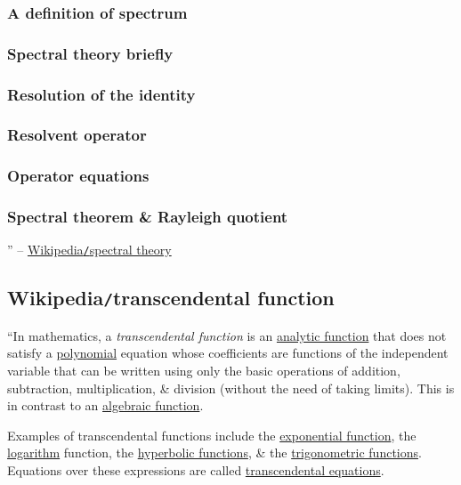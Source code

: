 \documentclass{article}
\begin{document}
\subsubsection{A definition of spectrum}

\subsubsection{Spectral theory briefly}

\subsubsection{Resolution of the identity}

\subsubsection{Resolvent operator}

\subsubsection{Operator equations}

\subsubsection{Spectral theorem \& Rayleigh quotient}

'' -- \href{https://en.wikipedia.org/wiki/Spectral_theory}{Wikipedia{\tt/}spectral theory}


\subsection{Wikipedia{\tt/}transcendental function}
``In mathematics, a {\it transcendental function} is an \href{https://en.wikipedia.org/wiki/Analytic_function}{analytic function} that does not satisfy a \href{https://en.wikipedia.org/wiki/Polynomial}{polynomial} equation whose coefficients are functions of the independent variable that can be written using only the basic operations of addition, subtraction, multiplication, \& division (without the need of taking limits). This is in contrast to an \href{https://en.wikipedia.org/wiki/Algebraic_function}{algebraic function}.

Examples of transcendental functions include the \href{https://en.wikipedia.org/wiki/Exponential_function}{exponential function}, the \href{https://en.wikipedia.org/wiki/Logarithm}{logarithm} function, the \href{https://en.wikipedia.org/wiki/Hyperbolic_function}{hyperbolic functions}, \& the \href{https://en.wikipedia.org/wiki/Trigonometric_function}{trigonometric functions}. Equations over these expressions are called \href{https://en.wikipedia.org/wiki/Transcendental_equation}{transcendental equations}.
\end{document}
